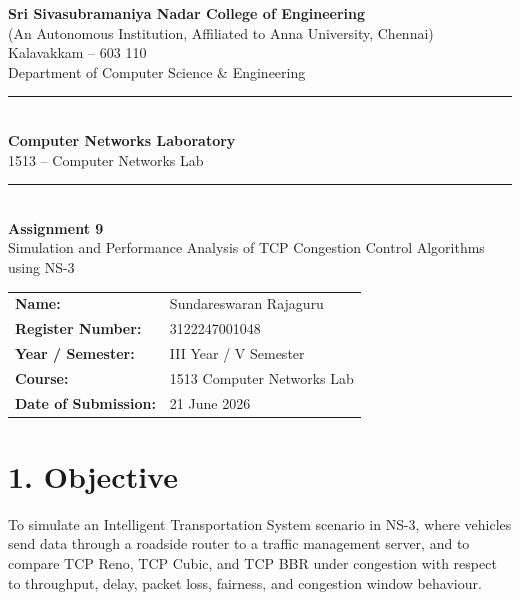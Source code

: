 \documentclass[11pt]{article}
\title{\vspace{-2cm}}
\date{}
\begin{document}
\begin{titlepage}
\centering
\vspace*{1cm}
{\large \textbf{Sri Sivasubramaniya Nadar College of Engineering}}\\
{\small (An Autonomous Institution, Affiliated to Anna University, Chennai)}\\
{\small Kalavakkam -- 603 110}\\[0.3cm]
{\small Department of Computer Science \& Engineering}\\[1.5cm]

\rule{\linewidth}{0.5mm}\\[0.4cm]
{\LARGE \textbf{Computer Networks Laboratory}}\\[0.3cm]
{\Large 1513 -- Computer Networks Lab}\\[0.4cm]
\rule{\linewidth}{0.5mm}\\[1.5cm]

{\huge \textbf{Assignment 9}}\\[0.4cm]
{\Large Simulation and Performance Analysis of TCP Congestion Control Algorithms using NS-3}\\[2cm]

\begin{center}
\begin{tabular}{ll}
\textbf{Name:} & Sundareswaran Rajaguru \\[0.2cm]
\textbf{Register Number:} & 3122247001048 \\[0.2cm]
\textbf{Year / Semester:} & III Year / V Semester \\[0.2cm]
\textbf{Course:} & 1513 Computer Networks Lab \\[0.2cm]
\textbf{Date of Submission:} & 21 June 2026 \\[0.2cm]
\end{tabular}
\end{center}

\vfill
\end{titlepage}

\section*{1. Objective}
To simulate an Intelligent Transportation System scenario in NS-3, where
vehicles send data through a roadside router to a traffic management server,
and to compare TCP Reno, TCP Cubic, and TCP BBR under congestion with respect
to throughput, delay, packet loss, fairness, and congestion window behaviour.
\end{document}
